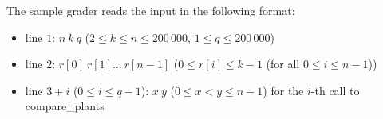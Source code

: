 The sample grader reads the input in the following format:
\begin{itemize}
\item line $1$: $n\ k\ q$ ($2 \leq k \leq n  \leq 200\,000$, $1 \leq q \leq 200\,000$)
\item line $2$: $r[0]\ r[1]\ldots\ r[n-1]$ ($0 \leq r[i] \leq k - 1$ (for all $0 \leq i \leq n - 1$))
\item line $3 + i$ ($0 \leq i \leq q - 1$): $x\ y$ ($0 \leq x < y \leq n - 1$) for the $i$-th call to {compare\_plants}
\end{itemize}
